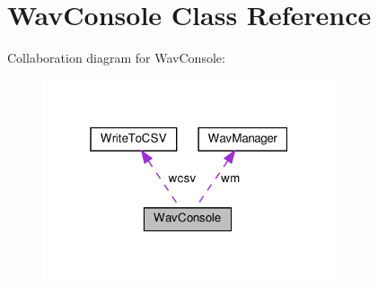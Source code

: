 \hypertarget{classWavConsole}{}\section{Wav\+Console Class Reference}
\label{classWavConsole}


Collaboration diagram for Wav\+Console\+:
\nopagebreak
\begin{figure}[H]
\begin{center}
\leavevmode
\includegraphics[width=244pt]{de/dee/classWavConsole__coll__graph}
\end{center}
\end{figure}
